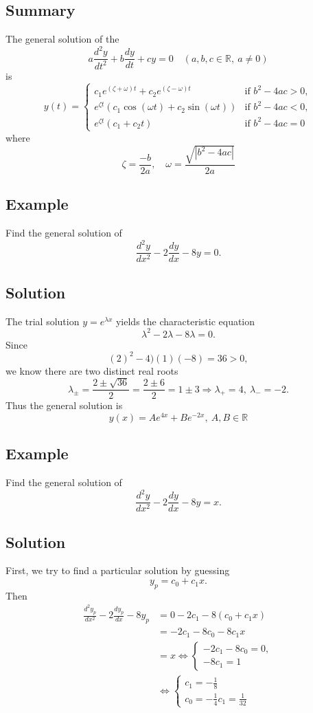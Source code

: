 \documentclass[11pt]{article}
\newcommand{\reals}{\mathbb{R}}
\begin{document}
\subsection{Summary}
The general solution of the 
\[ a \frac{d^2 y}{dt^2} + b \frac{dy}{dt} + cy = 0 \quad (a, b, c \in \reals,\ a \not= 0)\]
is
\[ y(t) = \begin{cases}
c_1 e^{(\zeta + \omega)t} + c_2 e^{(\zeta - \omega)t} & \text{if } b^2 - 4ac > 0, \\
e^{\zeta t} (c_1 \cos(\omega t) + c_2 \sin(\omega t)) & \text{if } b^2 - 4ac < 0, \\
e^{\zeta t}(c_1 + c_2 t) & \text{if } b^2 - 4ac = 0
\end{cases} \]
where
\[ \zeta = \frac{-b}{2a}, \quad \omega = \frac{\sqrt{|b^2 - 4ac|}}{2a} \]

\subsection{Example}
Find the general solution of
\[ \frac{d^2 y}{dx^2} - 2\frac{dy}{dx} - 8y = 0. \]

\subsection*{Solution}
The trial solution $y = e^{\lambda x}$ yields the characteristic equation
\[ \lambda^2 - 2\lambda - 8\lambda = 0. \]
Since
\[ (2)^2 - 4)(1)(-8) = 36 > 0, \]
we know there are two distinct real roots
\[ \lambda_\pm = \frac{2 \pm \sqrt{36}}{2} = \frac{2 \pm 6}{2} = 1 \pm 3 \Rightarrow \lambda_+ = 4,\ \lambda_- = -2. \]
Thus the general solution is
\[ y(x) = Ae^{4x} + Be^{-2x},\ A, B \in \reals \]

\subsection{Example}
Find the general solution of 
\[ \frac{d^2 y}{dx^2} - 2\frac{dy}{dx} - 8y = x. \]

\subsection*{Solution}
First, we try to find a particular solution by guessing
\[ y_p = c_0 + c_1 x. \]
Then
\begin{align*}
\frac{d^2 y_p}{dx^2} - 2 \frac{dy_p}{dx} - 8 y_p &= 0 - 2c_1 - 8(c_0 + c_1x) \\
&= -2c_1 - 8c_0 - 8c_1 x \\
&= x \Leftrightarrow \begin{cases}
-2c_1  - 8c_0 = 0, \\
-8c_1 = 1
\end{cases} \\
&\Leftrightarrow \begin{cases}
c_1 = -\frac{1}{8} \\
c_0 = -\frac{1}{4}c_1 = \frac{1}{32}
\end{cases}
\end{align*}
\end{document}
